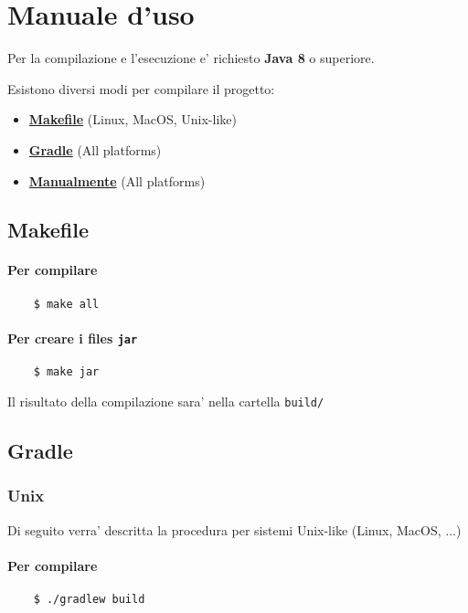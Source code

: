 \section{Manuale d'uso}

Per la compilazione e l'esecuzione e' richiesto \textbf{Java 8} o superiore.

Esistono diversi modi per compilare il progetto:
\begin{itemize}
	\item \hyperlink{makefile}{\textbf{Makefile}} (Linux, MacOS, Unix-like)
	\item \hyperlink{gradle}{\textbf{Gradle}} (All platforms)
	\item \hyperlink{manual}{\textbf{Manualmente}} (All platforms)
\end{itemize}

\hypertarget{makefile}{}
\subsection{Makefile}

\paragraph{Per compilare}
\begin{verbatim}
	$ make all
\end{verbatim}

\paragraph{Per creare i files \texttt{jar}}
\begin{verbatim}
	$ make jar
\end{verbatim}

Il risultato della compilazione sara' nella cartella \texttt{build/}

\bigskip
\bigskip
\hypertarget{gradle}{}
\subsection{Gradle}

\subsubsection{Unix}
Di seguito verra' descritta la procedura per sistemi Unix-like (Linux, MacOS, ...)

\paragraph{Per compilare}
\begin{verbatim}
	$ ./gradlew build
\end{verbatim}

